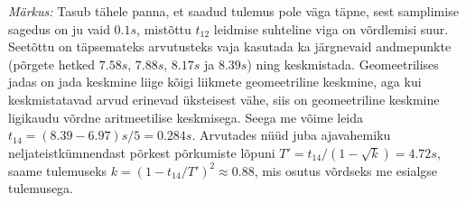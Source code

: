 \emph{Märkus:} Tasub tähele panna, et saadud tulemus pole väga täpne, sest samplimise sagedus on ju vaid $\SI{0.1}s$, mistõttu $t_{12}$ leidmise suhteline viga on võrdlemisi suur. Seetõttu on täpsemateks arvutusteks vaja kasutada ka järgnevaid andmepunkte (põrgete hetked $\SI{7.58}s$, $\SI{7.88}s$, $\SI{8.17}s$ ja $\SI{8.39}s$) ning keskmistada. Geomeetrilises jadas on jada keskmine liige kõigi liikmete geomeetriline keskmine, aga kui keskmistatavad arvud erinevad üksteisest vähe, siis on geomeetriline keskmine ligikaudu võrdne aritmeetilise keskmisega. Seega me võime leida $t_{14}=(\num{8.39}-\num{6.97})\unit{s}/5= \SI{0.284}s$. Arvutades nüüd juba ajavahemiku neljateistkümnendast põrkest põrkumiste lõpuni $T'=t_{14}/(1-\sqrt k)=\SI{4.72}s$, saame tulemuseks $k=(1-t_{14}/T')^2\approx 0.88$, mis osutus võrdseks me esialgse tulemusega.
\probend